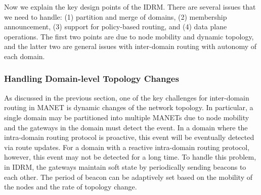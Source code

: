
Now we explain the key design points of the IDRM. There are several issues that we need to handle: (1) partition and merge of domains, (2) membership announcement, (3) support for policy-based routing, and (4) data plane operations. The first two points are due to node mobility and dynamic topology, and the latter two are general issues with inter-domain routing with autonomy of each domain.

\subsubsection{Handling Domain-level Topology Changes} 

As discussed in the previous section, one of the key challenges for inter-domain routing in MANET is dynamic changes of the network topology. In particular, a single domain may be partitioned into multiple MANETs due to node mobility and the gateways in the domain must detect the event.
In a domain where the intra-domain routing protocol is proactive, this event will be eventually detected via route updates. For a domain with a reactive intra-domain routing protocol, however, this event may not be detected for a long time. To handle this problem, in IDRM, the gateways maintain soft state by periodically sending beacons to each other. The period of beacon can be adaptively set based on the mobility of the nodes and the rate of topology change.

